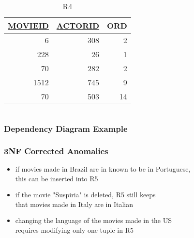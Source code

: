 \documentclass[dvipsnames]{beamer}
\begin{document}
\begin{frame}
\begin{example}
\begin{columns}[t]
      \begin{tiny}
      \begin{table}
        \caption{R4}
        \begin{tabular}{|r|r|r|}\hline
\underline{MOVIEID} & \underline{ACTORID} & ORD\\[2pt]\hline\hline
   6 & 308 &  2\\\hline
 228 &  26 &  1\\\hline
  70 & 282 &  2\\\hline
1512 & 745 &  9\\\hline
  70 & 503 & 14\\\hline
        \end{tabular}
      \end{table}
      \end{tiny}
    \end{columns}
  \end{example}
\end{frame}

\begin{frame}
  \frametitle{Dependency Diagram Example}

  \begin{example}
    \begin{center}
    \end{center}
  \end{example}
 \end{frame}

\begin{frame}
  \frametitle{3NF Corrected Anomalies}

  \begin{example}
    \begin{itemize}
      \item if movies made in Brazil are in known to be in Portuguese,\\
	this can be inserted into R5

      \pause
      \item if the movie "Suspiria" is deleted, R5 still keeps\\
        that movies made in Italy are in Italian

      \pause
      \item changing the language of the movies made in the US\\
	requires modifying only one tuple in R5
    \end{itemize}
  \end{example}
\end{frame}
\end{document}
